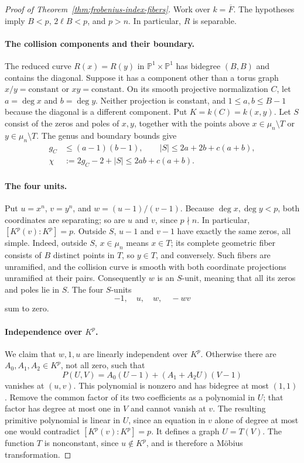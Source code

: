 \documentclass[11pt,letterpaper]{article}
\theoremstyle{definition}
\theoremstyle{remark}
\begin{document}
\begin{proof}[Proof of Theorem~\ref{thm:frobenius-index-fibers}]
Work over $k=\overline F$. The hypotheses imply $B<p$,
$2\ell B<p$, and $p>n$. In particular, $R$ is separable.

\paragraph{The collision components and their boundary.}
The reduced curve $R(x)=R(y)$ in
$\mathbb P^1\times\mathbb P^1$ has bidegree $(B,B)$ and contains
the diagonal. Suppose it has a component other than a torus graph
$x/y=\text{constant}$ or $xy=\text{constant}$. On its smooth
projective normalization $C$, let $a=\deg x$ and $b=\deg y$.
Neither projection is constant, and $1\le a,b\le B-1$ because
the diagonal is a different component. Put $K=k(C)=k(x,y)$.
Let $S$ consist of the zeros and poles of $x,y$, together with
the points above $x\in\mu_n\setminus T$ or $y\in\mu_n\setminus T$.
The genus and boundary bounds give
\begin{equation}\label{eq:frobenius-index-chi}
 \begin{split}
 g_C&\le(a-1)(b-1),\qquad |S|\le2a+2b+c(a+b),\\
 \chi&:=2g_C-2+|S|\le2ab+c(a+b).
 \end{split}
\end{equation}

\paragraph{The four units.}
Put $u=x^n$, $v=y^n$, and $w=(u-1)/(v-1)$.
Because $\deg x,\deg y<p$, both coordinates are separating;
so are $u$ and $v$, since $p\nmid n$. In particular,
$[K^p(v):K^p]=p$. Outside $S$, $u-1$ and $v-1$ have exactly
the same zeros, all simple. Indeed, outside $S$, $x\in\mu_n$
means $x\in T$; its complete geometric fiber consists of $B$
distinct points in $T$, so $y\in T$, and conversely. Such fibers
are unramified, and the collision curve is smooth with both
coordinate projections unramified at their pairs.
Consequently $w$ is an $S$-unit, meaning that all its zeros and
poles lie in $S$. The four $S$-units
\[
 -1,\quad u,\quad w,\quad -wv
\]
sum to zero.

\paragraph{Independence over $K^p$.}
We claim that $w,1,u$ are linearly independent over $K^p$.
Otherwise there are $A_0,A_1,A_2\in K^p$, not all zero, such that
\[
 P(U,V)=A_0(U-1)+(A_1+A_2U)(V-1)
\]
vanishes at $(u,v)$. This polynomial is nonzero and has bidegree
at most $(1,1)$. Remove the common factor of its two coefficients
as a polynomial in $U$; that factor has degree at most one in $V$
and cannot vanish at $v$. The resulting primitive polynomial is
linear in $U$, since an equation in $v$ alone of degree at most one
would contradict $[K^p(v):K^p]=p$. It defines a graph $U=T(V)$.
The function $T$ is nonconstant, since $u\notin K^p$, and is
therefore a M\"obius transformation.


\end{proof}
\end{document}
